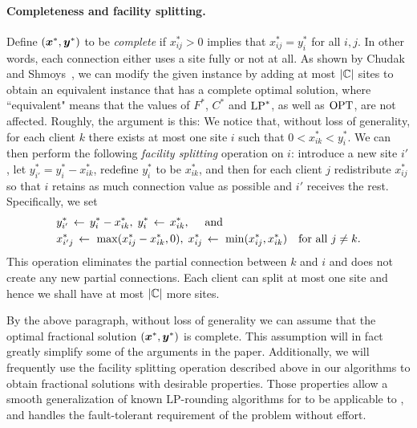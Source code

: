 \documentclass[oneside,final]{ucr}
\begin{document}

\paragraph{Completeness and facility splitting.}
Define $(\boldsymbol{x}^\ast, \boldsymbol{y}^\ast)$ to be \emph{complete} if
$x_{ij}^\ast>0$ implies that $x_{ij}^\ast=y_i^\ast$ for all $i,j$. In
other words, each connection either uses a site fully or not at all.
As shown by Chudak and Shmoys~\cite{ChudakS04}, we can modify the
given instance by adding at most $|\mathbb{C}|$ sites to obtain an
equivalent instance that has a complete optimal solution, where
``equivalent" means that the values of $F^\ast$, $C^\ast$ and
$\mbox{\rm LP}^\ast$, as well as $\mbox{\rm OPT}$, are not affected. Roughly, the argument
is this: We notice that, without loss of generality, for each client
$k$ there exists at most one site $i$ such that $0 < x_{ik}^\ast <
y_i^\ast$.  We can then perform the following \emph{facility
  splitting} operation on $i$: introduce a new site $i'$, let
$y^\ast_{i'} = y^\ast_i - x^\ast_{ik}$, redefine $y^\ast_i$ to be
$x^\ast_{ik}$, and then for each client $j$ redistribute $x^\ast_{ij}$
so that $i$ retains as much connection value as possible and $i'$
receives the rest. Specifically, we set
%
\begin{align*}
  &y^\ast_{i'} \;{\,\leftarrow\,}\; y^\ast_i - x^\ast_{ik},\;   y^\ast_{i} \;{\,\leftarrow\,}\; x^\ast_{ik}, \quad \text{ and }\\
  &x^\ast_{i'j} \;{\,\leftarrow\,}\;\max( x^\ast_{ij} - x^\ast_{ik}, 0 ),\;	 x^\ast_{ij} \;{\,\leftarrow\,}\; \min( x^\ast_{ij} , x^\ast_{ik}) 
			\quad	\textrm{for all}\ j \neq k.
\end{align*}
%
This operation eliminates the partial connection between $k$
and $i$ and does not create any new partial
connections. Each client can split at most one site and
hence we shall have at most $|\mathbb{C}|$ more sites.

By the above paragraph, without loss of generality we can
assume that the optimal fractional solution $(\boldsymbol{x}^\ast,
\boldsymbol{y}^\ast)$ is complete. This assumption will in fact
greatly simplify some of the arguments in the
paper. Additionally, we will frequently use the facility
splitting operation described above in our algorithms to
obtain fractional solutions with desirable properties. Those
properties allow a smooth generalization of known
LP-rounding algorithms for {\UFL} to be applicable to
{\FTFP}, and handles the fault-tolerant requirement of the
problem without effort.


\end{document}
